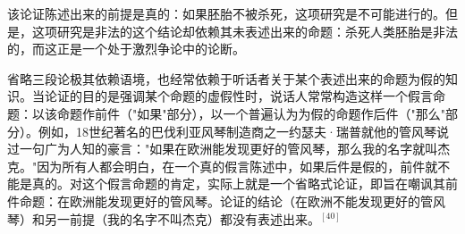 该论证陈述出来的前提是真的：如果胚胎不被杀死，这项研究是不可能进行的。但是，这项研究是非法的这个结论却依赖其未表述出来的命题：杀死人类胚胎是非法的，而这正是一个处于激烈争论中的论断。

省略三段论极其依赖语境，也经常依赖于听话者关于某个表述出来的命题为假的知识。当论证的目的是强调某个命题的虚假性时，说话人常常构造这样一个假言命题：以该命题作前件（"如果"部分），以一个普遍认为为假的命题作后件（"那么"部分）。例如，18世纪著名的巴伐利亚风琴制造商之一约瑟夫·瑞普就他的管风琴说过一句广为人知的豪言："如果在欧洲能发现更好的管风琴，那么我的名字就叫杰克。"因为所有人都会明白，在一个真的假言陈述中，如果后件是假的，前件就不能是真的。对这个假言命题的肯定，实际上就是一个省略式论证，即旨在嘲讽其前件命题：在欧洲能发现更好的管风琴。论证的结论（在欧洲不能发现更好的管风琴）和另一前提（我的名字不叫杰克）都没有表述出来。${}^{[40]}$

\begin{center}
\end{center} 